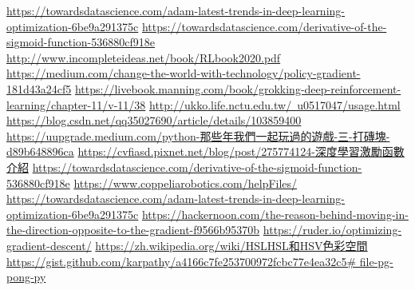 \newpage
\renewcommand\bibname{參~考~文~獻}
\begin{thebibliography}{99}  %
\href{https://towardsdatascience.com/adam-latest-trends-in-deep-learning-optimization-6be9a291375c}{https://towardsdatascience.com/adam-latest-trends-in-deep-learning-optimization-6be9a291375c}
\href{https://towardsdatascience.com/derivative-of-the-sigmoid-function-536880cf918e}{https://towardsdatascience.com/derivative-of-the-sigmoid-function-536880cf918e}
\href{http://www.incompleteideas.net/book/RLbook2020.pdf}{http://www.incompleteideas.net/book/RLbook2020.pdf}
\href{https://medium.com/change-the-world-with-technology/policy-gradient-181d43a24cf5}{https://medium.com/change-the-world-with-technology/policy-gradient-181d43a24cf5}
\href{https://livebook.manning.com/book/grokking-deep-reinforcement-learning/chapter-11/v-11/38}{https://livebook.manning.com/book/grokking-deep-reinforcement-learning/chapter-11/v-11/38}
\href{http://ukko.life.nctu.edu.tw/~u0517047/usage.html}{http://ukko.life.nctu.edu.tw/~u0517047/usage.html}
\href{https://blog.csdn.net/qq_35027690/article/details/103859400}{https://blog.csdn.net/qq35027690/article/details/103859400}
\href{https://uupgrade.medium.com/python-那些年我們一起玩過的遊戲-三-打磚塊-d89b648896ca}{https://uupgrade.medium.com/python-那些年我們一起玩過的遊戲-三-打磚塊-d89b648896ca}
\href{https://cvfiasd.pixnet.net/blog/post/275774124-深度學習激勵函數介紹}{https://cvfiasd.pixnet.net/blog/post/275774124-深度學習激勵函數介紹}
\href{https://towardsdatascience.com/derivative-of-the-sigmoid-function-536880cf918e}{https://towardsdatascience.com/derivative-of-the-sigmoid-function-536880cf918e}
\href{https://www.coppeliarobotics.com/helpFiles/}{https://www.coppeliarobotics.com/helpFiles/}
\href{https://towardsdatascience.com/adam-latest-trends-in-deep-learning-optimization-6be9a291375c}{https://towardsdatascience.com/adam-latest-trends-in-deep-learning-optimization-6be9a291375c}
\href{https://hackernoon.com/the-reason-behind-moving-in-the-direction-opposite-to-the-gradient-f9566b95370b}{https://hackernoon.com/the-reason-behind-moving-in-the-direction-opposite-to-the-gradient-f9566b95370b}\label{OGD}
\href{https://ruder.io/optimizing-gradient-descent/}{https://ruder.io/optimizing-gradient-descent/}
\label{OGD2}
\href{https://reurl.cc/gz0YjN}{https://zh.wikipedia.org/wiki/HSLHSL和HSV色彩空間}
\label{RGBtoHSV}
\href{https://reurl.cc/gzMm4N}{https://gist.github.com/karpathy/a4166c7fe253700972fcbc77e4ea32c5\# file-pg-pong-py}\label{R.pong1}
%
\end{thebibliography}
\newpage